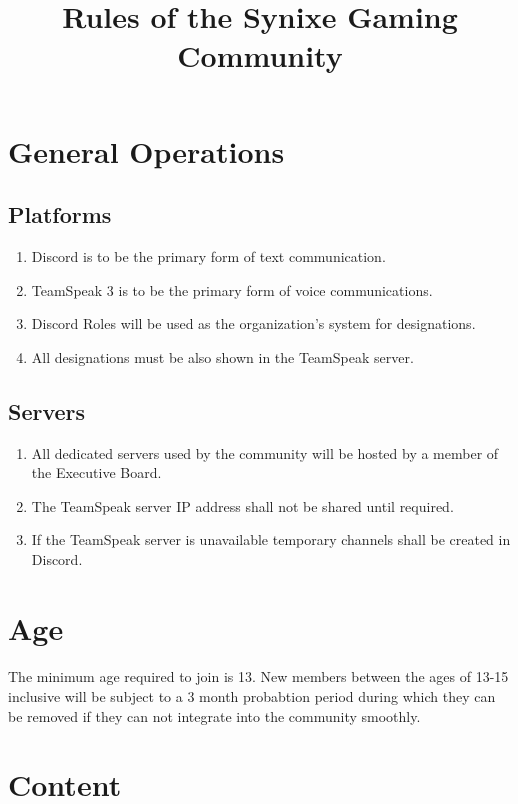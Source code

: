 \documentclass[10pt,a4paper]{article}
\title{Rules of the Synixe Gaming Community}
\begin{document}
\maketitle
\newpage

\section{General Operations}
\subsection{Platforms}
\begin{enumerate}
	\item Discord is to be the primary form of text communication.
	\item TeamSpeak 3 is to be the primary form of voice communications.
	\item Discord Roles will be used as the organization's system for designations.
	\item All designations must be also shown in the TeamSpeak server.
\end{enumerate}
\subsection{Servers}
\begin{enumerate}
	\item All dedicated servers used by the community will be hosted by a member of the Executive Board.
	\item The TeamSpeak server IP address shall not be shared until required.
	\item If the TeamSpeak server is unavailable temporary channels shall be created in Discord.
\end{enumerate}
\section{Age}
\paragraph{}
The minimum age required to join is 13. New members between the ages of 13-15 inclusive will be subject to a 3 month probabtion period during which they can be removed if they can not integrate into the community smoothly.
\section{Content} \label{content}
\end{document}
